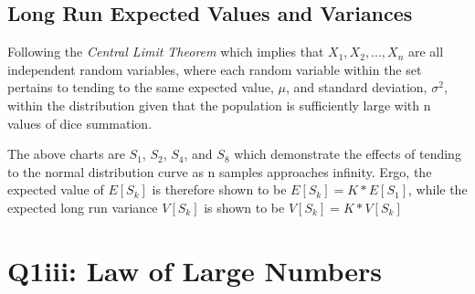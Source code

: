 \documentclass[12pt]{article}
\begin{document}
\subsection{Long Run Expected Values and Variances}
Following the \emph{Central Limit Theorem} which implies that $X_1,X_2,...,X_n$ are all independent random variables, where each random variable within the set pertains to tending to the same expected value, $\mu$, and standard deviation, $\sigma^2$, within the distribution given that the population is sufficiently large with n values of dice summation.


The above charts are $S_1$, $S_2$, $S_4$, and $S_8$ which demonstrate the effects of tending to the normal distribution curve as n samples approaches infinity.  Ergo, the expected value of $E[S_k]$ is therefore shown to be $E[S_k]=K*E[S_1]$, while the expected long run variance $V[S_k]$ is shown to be $V[S_k]=K*V[S_k]$
\section{Q1iii: Law of Large Numbers}
\end{document}
